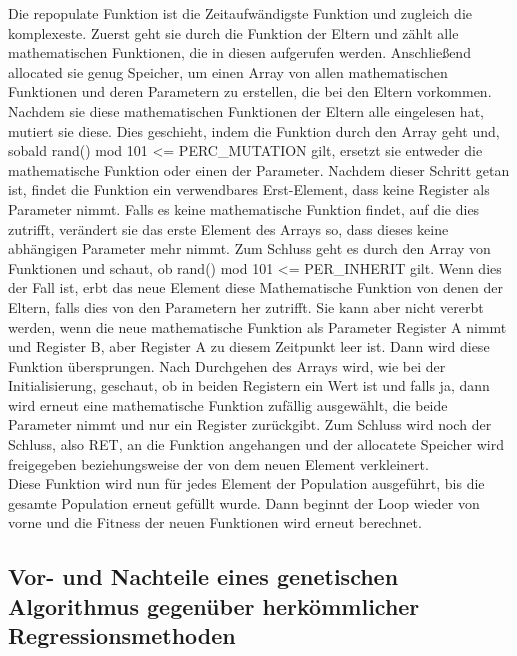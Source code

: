 \documentclass[a4paper,12pt]{article}
\begin{document}
Die repopulate Funktion ist die Zeitaufwändigste Funktion und zugleich die komplexeste. Zuerst geht sie durch die Funktion der Eltern und zählt alle mathematischen Funktionen, die in diesen aufgerufen werden. Anschließend allocated sie genug Speicher, um einen Array von allen mathematischen Funktionen und deren Parametern zu erstellen, die bei den Eltern vorkommen. Nachdem sie diese mathematischen Funktionen der Eltern alle eingelesen hat, mutiert sie diese. Dies geschieht, indem die Funktion durch den Array geht und, sobald rand() mod 101 <= PERC\_MUTATION gilt, ersetzt sie entweder die mathematische Funktion oder einen der Parameter. Nachdem dieser Schritt getan ist, findet die Funktion ein verwendbares Erst-Element, dass keine Register als Parameter nimmt. Falls es keine mathematische Funktion findet, auf die dies zutrifft, verändert sie das erste Element des Arrays so, dass dieses keine abhängigen Parameter mehr nimmt. Zum Schluss geht es durch den Array von Funktionen und schaut, ob rand() mod 101 <= PER\_INHERIT gilt. Wenn dies der Fall ist, erbt das neue Element diese Mathematische Funktion von denen der Eltern, falls dies von den Parametern her zutrifft. Sie kann aber nicht vererbt werden, wenn die neue mathematische Funktion als Parameter Register A nimmt und Register B, aber Register A zu diesem Zeitpunkt leer ist. Dann wird diese Funktion übersprungen. Nach Durchgehen des Arrays wird, wie bei der Initialisierung, geschaut, ob in beiden Registern ein Wert ist und falls ja, dann wird erneut eine mathematische Funktion zufällig ausgewählt, die beide Parameter nimmt und nur ein Register zurückgibt. Zum Schluss wird noch der Schluss, also RET, an die Funktion angehangen und der allocatete Speicher wird freigegeben beziehungsweise der von dem neuen Element verkleinert. \\

Diese Funktion wird nun für jedes Element der Population ausgeführt, bis die gesamte Population erneut gefüllt wurde. Dann beginnt der Loop wieder von vorne und die Fitness der neuen Funktionen wird erneut berechnet. \\

\subsection{Vor- und Nachteile eines genetischen Algorithmus gegenüber herkömmlicher Regressionsmethoden}
\end{document}
